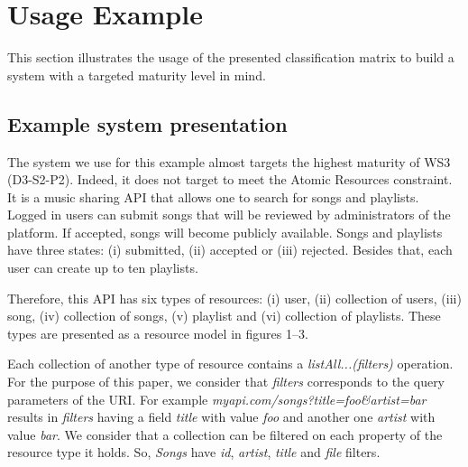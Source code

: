 \section{Usage Example}






This section illustrates the usage of the presented classification matrix to build a system with a targeted maturity level in mind.

\subsection{Example system presentation}

The system we use for this example almost targets the highest maturity of WS3 (D3-S2-P2). Indeed, it does not target to meet the Atomic Resources constraint. It is a music sharing API that allows one to search for songs and playlists. Logged in users can submit songs that will be reviewed by administrators of the platform. If accepted, songs will become publicly available. Songs and playlists have three states: (i) submitted, (ii) accepted or (iii) rejected. Besides that, each user can create up to ten playlists.

Therefore, this API has six types of resources: (i) user, (ii) collection of users, (iii) song, (iv) collection of songs, (v) playlist and (vi) collection of playlists. These types are presented as a resource model in figures 1--3.

Each collection of another type of resource contains a \textit{listAll...(filters)} operation. For the purpose of this paper, we consider that \textit{filters} corresponds to the query parameters of the URI. For example \textit{myapi.com/songs?title=foo\&artist=bar} results in \textit{filters} having a field \textit{title} with value \textit{foo} and another one \textit{artist} with value \textit{bar}. We consider that a collection can be filtered on each property of the resource type it holds. So, \textit{Songs} have \textit{id}, \textit{artist}, \textit{title} and \textit{file} filters.

